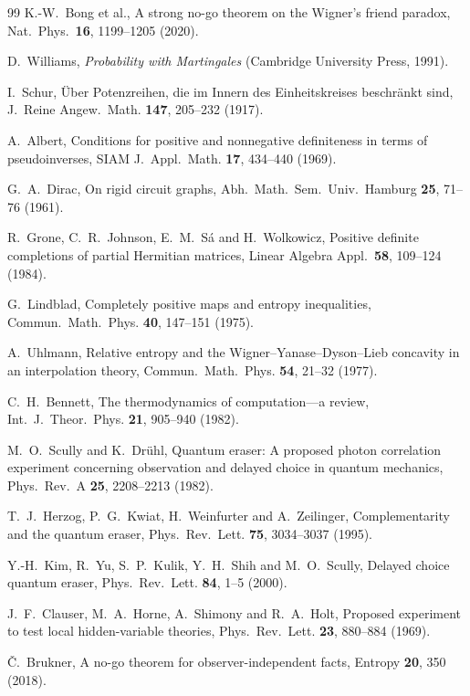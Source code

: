 \documentclass[aps,pra,onecolumn,superscriptaddress,nofootinbib,10pt]{revtex4-2}
\theoremstyle{definition}
\theoremstyle{remark}
\begin{document}
\begin{thebibliography}{99}
 K.-W.~Bong et al., A strong no-go theorem on the Wigner's friend paradox, Nat.\ Phys.\ \textbf{16}, 1199--1205 (2020).

 D.~Williams, \emph{Probability with Martingales} (Cambridge University Press, 1991).

 I.~Schur, \"Uber Potenzreihen, die im Innern des Einheitskreises beschr\"ankt sind, J.\ Reine Angew.\ Math. \textbf{147}, 205--232 (1917).

 A.~Albert, Conditions for positive and nonnegative definiteness in terms of pseudoinverses, SIAM J.\ Appl.\ Math. \textbf{17}, 434--440 (1969).

 G.~A.~Dirac, On rigid circuit graphs, Abh.\ Math.\ Sem.\ Univ.\ Hamburg \textbf{25}, 71--76 (1961).

 R.~Grone, C.~R.~Johnson, E.~M.~S\'a and H.~Wolkowicz, Positive definite completions of partial Hermitian matrices, Linear Algebra Appl.\ \textbf{58}, 109--124 (1984).

 G.~Lindblad, Completely positive maps and entropy inequalities, Commun.\ Math.\ Phys. \textbf{40}, 147--151 (1975).

 A.~Uhlmann, Relative entropy and the Wigner--Yanase--Dyson--Lieb concavity in an interpolation theory, Commun.\ Math.\ Phys. \textbf{54}, 21--32 (1977).

 C.~H.~Bennett, The thermodynamics of computation---a review, Int.\ J.\ Theor.\ Phys. \textbf{21}, 905--940 (1982).

 M.~O.~Scully and K.~Dr\"uhl, Quantum eraser: A proposed photon correlation experiment concerning observation and delayed choice in quantum mechanics, Phys.\ Rev.\ A \textbf{25}, 2208--2213 (1982).

 T.~J.~Herzog, P.~G.~Kwiat, H.~Weinfurter and A.~Zeilinger, Complementarity and the quantum eraser, Phys.\ Rev.\ Lett. \textbf{75}, 3034--3037 (1995).

 Y.-H.~Kim, R.~Yu, S.~P.~Kulik, Y.~H.~Shih and M.~O.~Scully, Delayed choice quantum eraser, Phys.\ Rev.\ Lett. \textbf{84}, 1--5 (2000).

 J.~F.~Clauser, M.~A.~Horne, A.~Shimony and R.~A.~Holt, Proposed experiment to test local hidden-variable theories, Phys.\ Rev.\ Lett. \textbf{23}, 880--884 (1969).

 \v{C}.~Brukner, A no-go theorem for observer-independent facts, Entropy \textbf{20}, 350 (2018).


\end{thebibliography}
\end{document}

